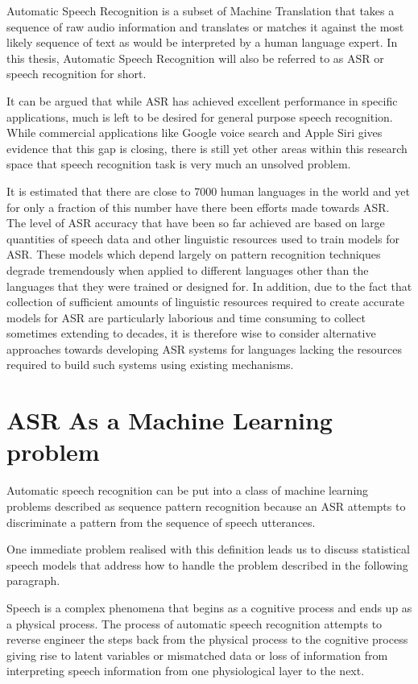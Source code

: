 Automatic Speech Recognition is a subset of Machine Translation that takes a sequence of raw audio information and translates or matches it against the most likely sequence of text as would be interpreted by a human language expert.  In this thesis, Automatic Speech Recognition will also be referred to as 
ASR or speech recognition for short.

It can be argued that while ASR has achieved excellent performance in specific applications, much is left to be desired for general purpose speech recognition. While commercial applications like Google voice search and Apple Siri gives evidence that this gap is closing, there is still yet other areas within this research space that speech recognition task is very much an unsolved problem.

It is estimated that there are close to 7000 human languages in the world \citep{besacier2014automatic} and yet for only a fraction of this number have there been efforts made towards ASR.  The level of ASR accuracy that have been so far achieved are based on large quantities of speech data and other linguistic resources used to train models for ASR. These models which depend largely on pattern recognition techniques degrade tremendously  when applied to different languages other than the languages that they were trained or designed for.  In addition, due to the fact that collection of sufficient amounts of linguistic resources required to create accurate models for ASR are particularly laborious and time consuming to collect sometimes extending to decades, it is therefore wise to consider alternative approaches towards developing ASR systems for  languages lacking the resources required to build such systems using existing mechanisms.

\section{ASR As a Machine Learning  problem}\label{ASRMLP}
\pagestyle{plain}
Automatic speech recognition can be put into a class of machine learning problems described as sequence pattern recognition because an ASR attempts to discriminate a pattern from the sequence of speech utterances. 

One immediate problem realised with this definition leads us to discuss statistical speech models that address how to handle the problem described in the following paragraph.

Speech is a complex phenomena that begins as a cognitive process and ends up as a physical process.  The process of automatic speech recognition attempts to reverse engineer the steps back from the physical process to the cognitive process giving rise to latent variables or mismatched data or loss of information from interpreting speech information from one physiological layer to the next.

